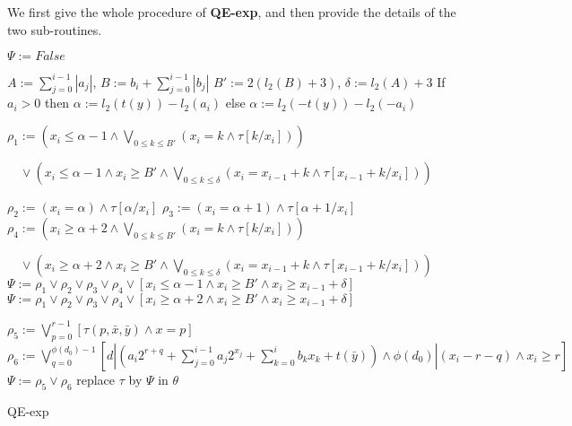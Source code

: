 We first give the whole procedure of \textbf{QE-exp},
and then provide the details of the two sub-routines.
\begin{algorithm}[t]
    \SetAlgoLined
    
    {
        $\Psi:= \textit{False}$\;
        { 
            $A :=  \sum_{j=0}^{i-1}|a_j|$, $B:= b_i + \sum_{j=0}^{i-1}|b_j|$\;
            $B':= 2(l_2(B)+3)$, $\delta:=  l_2(A)+3$\;
            If $a_i>0$ then $\alpha := l_2(t(y))-l_2(a_i)$
            else $\alpha := l_2(-t(y))-l_2(-a_i)$\;
            
            $\rho_1 :=  (x_i \le \alpha -1 \wedge \bigvee_{0\le k\le B'}(x_i=k \wedge \tau[k/x_i] ))$
    
            $\quad \vee ( x_i \le \alpha -1 \wedge x_i\ge B' \wedge \bigvee_{0\le k \le \delta} (x_i = x_{i-1}+k \wedge \tau[x_{i-1}+k/x_i]))$\;
                
            $\rho_2 :=  (x_i = \alpha) \wedge \tau[\alpha/x_i]$\;
            $\rho_3 :=  (x_i = \alpha+1) \wedge \tau[\alpha+1/x_i]$\;
            $\rho_4 :=  (x_i \ge \alpha+2 \wedge \bigvee_{0\le k\le B'}(x_i=k \wedge \tau[k/x_i] ))$
        
            $\quad \vee (x_i \ge \alpha +2 \wedge x_i\ge B' \wedge \bigvee_{0\le k \le \delta}(x_i = x_{i-1}+k \wedge \tau[x_{i-1}+k/x_i]))
            $\;
            {
                $\Psi := \rho_1 \vee \rho_2 \vee \rho_3 \vee \rho_4 
                \vee [x_i \le \alpha -1 \wedge x_i \ge B' \wedge x_i \ge x_{i-1}+\delta]$
            }
            {
                $\Psi := \rho_1 \vee \rho_2 \vee \rho_3 \vee \rho_4 
                \vee [x_i \ge \alpha +2 \wedge x_i \ge B' \wedge x_i \ge x_{i-1}+\delta]$    
            }
            }
        {
            $\rho_5 := \bigvee_{p=0}^{r-1} [\tau(p,\bar{x},\bar{y})\wedge x=p]$\;
            $\rho_6 := \bigvee_{q=0}^{\phi(d_0)-1} [d|(a_i 2^{r+q}+\sum_{j=0}^{i-1} a_j 2^{x_j}
            +  \sum_{k=0}^{i} b_k x_k+t(\bar{y})) \wedge \phi(d_0)|(x_i-r-q) \wedge x_i \ge r]
            $\;
            $\Psi :=  \rho_5 \vee \rho_6$
        }
        replace $\tau$ by $\Psi$ in $\theta$\;
    }
    \caption{QE-exp}
\end{algorithm}



